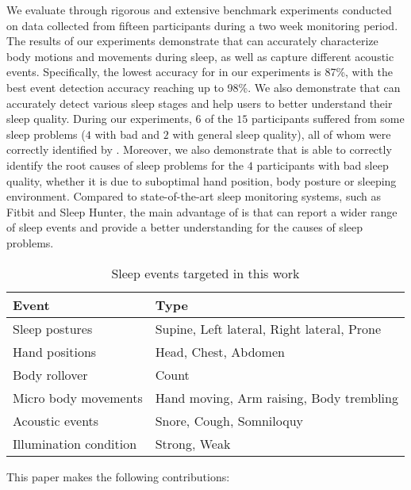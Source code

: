 We evaluate {\systemname} through rigorous and extensive benchmark experiments conducted on data collected from fifteen participants during a two week monitoring period. The results of our experiments demonstrate that {\systemname} can accurately characterize body motions and movements during sleep, as well as capture different acoustic events. Specifically, the lowest accuracy for {\systemname} in our experiments is 87\%, with the best event detection accuracy reaching up to 98\%. We also demonstrate that {\systemname} can accurately detect various sleep stages and help users to better understand their sleep quality. During our experiments, $6$ of the $15$ participants suffered from some sleep problems ($4$ with bad and $2$ with general sleep quality), all of whom were correctly identified by {\systemname}. Moreover, we also demonstrate that {\systemname} is able to correctly identify the root causes of sleep problems for the $4$ participants with bad sleep quality, whether it is due to suboptimal hand position, body posture or sleeping environment. Compared to state-of-the-art sleep monitoring systems, such as Fitbit and Sleep Hunter, the main advantage of {\systemname} is that can report a wider range of sleep events and provide a better understanding for the causes of sleep problems.

\begin{table}[!t]
 \caption{\label{tab:test}Sleep events targeted in this work}
 \centering
 \small
 \begin{tabular}{ll}
  \toprule
  \textbf{Event}& \textbf{Type} \\
  \midrule
\rowcolor{Gray}  Sleep postures & Supine, Left lateral, Right lateral, Prone\\
 Hand positions & Head, Chest, Abdomen\\
\rowcolor{Gray} Body rollover & Count\\
 Micro body movements& Hand moving, Arm raising, Body trembling \\
\rowcolor{Gray} Acoustic events & Snore, Cough, Somniloquy  \\
 Illumination condition & Strong, Weak  \\
  \bottomrule
 \end{tabular}
\end{table}


This paper makes the following contributions:

